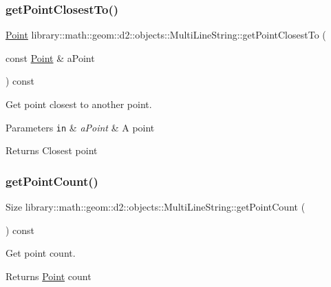 \subsubsection{\texorpdfstring{get\+Point\+Closest\+To()}{getPointClosestTo()}}
{\footnotesize\ttfamily \hyperlink{classlibrary_1_1math_1_1geom_1_1d2_1_1objects_1_1_point}{Point} library\+::math\+::geom\+::d2\+::objects\+::\+Multi\+Line\+String\+::get\+Point\+Closest\+To (\begin{DoxyParamCaption}\item[{const \hyperlink{classlibrary_1_1math_1_1geom_1_1d2_1_1objects_1_1_point}{Point} \&}]{a\+Point }\end{DoxyParamCaption}) const}



Get point closest to another point. 


\begin{DoxyParams}[1]{Parameters}
\mbox{\tt in}  & {\em a\+Point} & A point \\
\hline
\end{DoxyParams}
\begin{DoxyReturn}{Returns}
Closest point 
\end{DoxyReturn}
\mbox{\label{classlibrary_1_1math_1_1geom_1_1d2_1_1objects_1_1_multi_line_string_a8d70884126d16f15279c1c16291f5109}} 
\subsubsection{\texorpdfstring{get\+Point\+Count()}{getPointCount()}}
{\footnotesize\ttfamily Size library\+::math\+::geom\+::d2\+::objects\+::\+Multi\+Line\+String\+::get\+Point\+Count (\begin{DoxyParamCaption}{ }\end{DoxyParamCaption}) const}



Get point count. 

\begin{DoxyReturn}{Returns}
\hyperlink{classlibrary_1_1math_1_1geom_1_1d2_1_1objects_1_1_point}{Point} count 
\end{DoxyReturn}
\mbox{\label{classlibrary_1_1math_1_1geom_1_1d2_1_1objects_1_1_multi_line_string_a77de687b2c287226984e2614dafe744a}} 
